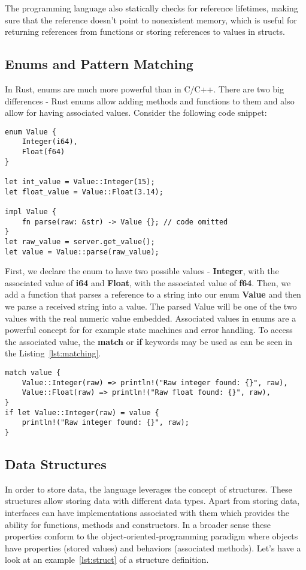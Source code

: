 The programming language also statically checks for reference lifetimes, making sure that the reference doesn't point to nonexistent memory, which is useful for returning references from functions or storing references to values in structs.

\subsection{Enums and Pattern Matching}
\label{subsec:enum}
In Rust, enums are much more powerful than in C/C++.
There are two big differences - Rust enums allow adding methods and functions to them and also allow for having associated values.
Consider the following code snippet:

\begin{lstlisting}[caption={Definining an enum with associated values in Rust.},label=lst:enum]
enum Value {
    Integer(i64),
    Float(f64)
}

let int_value = Value::Integer(15);
let float_value = Value::Float(3.14);

impl Value {
    fn parse(raw: &str) -> Value {}; // code omitted
}
let raw_value = server.get_value();
let value = Value::parse(raw_value);
\end{lstlisting}

First, we declare the enum to have two possible values - \textbf{Integer}, with the associated value of \textbf{i64} and \textbf{Float}, with the associated value of \textbf{f64}.
Then, we add a function that parses a reference to a string into our enum \textbf{Value} and then we parse a received string into a value.
The parsed Value will be one of the two values with the real numeric value embedded.
Associated values in enums are a powerful concept for for example state machines and error handling.
To access the associated value, the \textbf{match} or \textbf{if} keywords may be used as can be seen in the Listing~\ref{lst:matching}.

\begin{lstlisting}[caption={Matching an enum variants.},label=lst:matching]
match value {
    Value::Integer(raw) => println!("Raw integer found: {}", raw),
    Value::Float(raw) => println!("Raw float found: {}", raw),
}
if let Value::Integer(raw) = value {
    println!("Raw integer found: {}", raw);
}
\end{lstlisting}

\subsection{Data Structures}
\label{subsec:struct}
In order to store data, the language leverages the concept of structures.
These structures allow storing data with different data types.
Apart from storing data, interfaces can have implementations associated with them which provides the ability for functions, methods and constructors.
In a broader sense these properties conform to the object-oriented-programming paradigm where objects have properties (stored values) and behaviors (associated methods).
Let's have a look at an example~\ref{lst:struct} of a structure definition.

